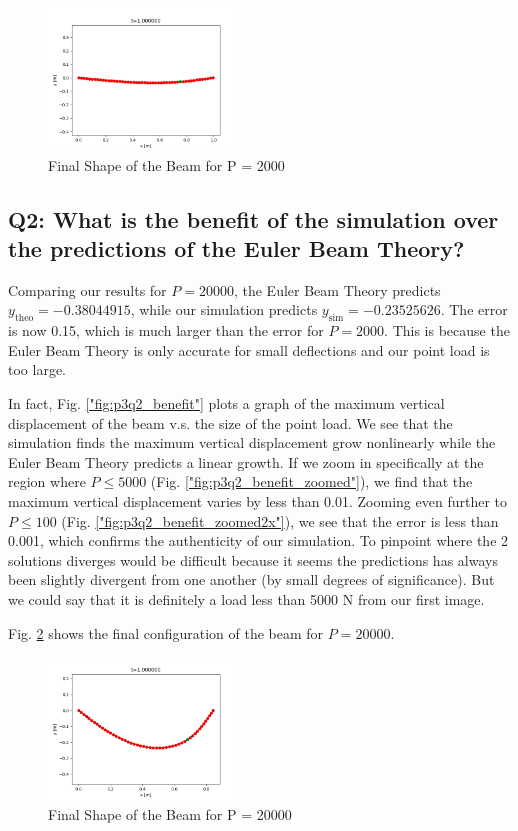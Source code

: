 \documentclass[letterpaper, 10 pt, conference]{ieeeconf}  %
\begin{document}
\begin{figure}[!ht]
        \centering
        \includegraphics[width=0.45\textwidth,keepaspectratio]{p3q1_implicit_2000.png}
        \caption{Final Shape of the Beam for P = 2000}
        \label{"fig:p3q1_beam2000"}
\end{figure}

\subsection*{Q2: What is the benefit of the simulation over the predictions of the Euler Beam Theory?}

Comparing our results for $P = 20000$, the Euler Beam Theory predicts $y_{\text{theo}} = -0.38044915$, while our simulation predicts $y_{\text{sim}} = -0.23525626$. The error is now 0.15, which is much larger than the error for $P = 2000$. This is because the Euler Beam Theory is only accurate for small deflections and our point load is too large.

In fact, Fig. \ref{"fig:p3q2_benefit"} plots a graph of the maximum vertical displacement of the beam v.s. the size of the point load. We see that the simulation finds the maximum vertical displacement grow nonlinearly while the Euler Beam Theory predicts a linear growth. If we zoom in specifically at the region where $P \leq 5000$ (Fig. \ref{"fig:p3q2_benefit_zoomed"}), we find that the maximum vertical displacement varies by less than 0.01. Zooming even further to $P \leq 100$ (Fig. \ref{"fig:p3q2_benefit_zoomed2x"}), we see that the error is less than 0.001, which confirms the authenticity of our simulation. To pinpoint where the 2 solutions diverges would be difficult because it seems the predictions has always been slightly divergent from one another (by small degrees of significance). But we could say that it is definitely a load less than 5000 N from our first image. 

Fig. \ref{"fig:p3q1_beam20000"} shows the final configuration of the beam for $P = 20000$.

\begin{figure}[!ht]
        \centering
        \includegraphics[width=0.45\textwidth,keepaspectratio]{p3q2_implicit_20000.png}
        \caption{Final Shape of the Beam for P = 20000}
        \label{"fig:p3q1_beam20000"}
\end{figure}
\end{document}
